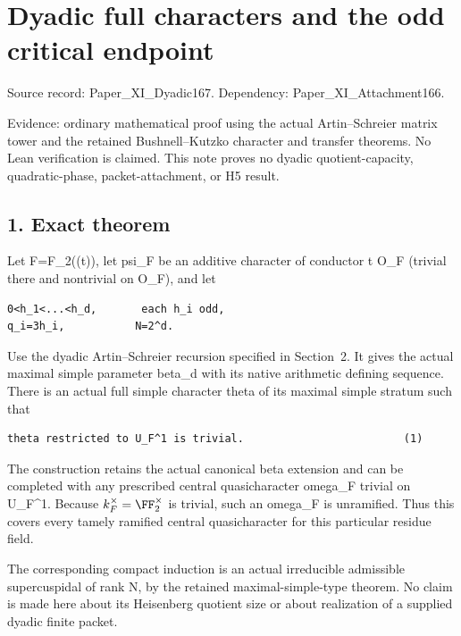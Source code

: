 \clearpage
\section{Dyadic full characters and the odd critical endpoint}\label{app:dyadic_character}

Source record: Paper\_XI\_Dyadic167. Dependency:
Paper\_XI\_Attachment166.

Evidence: ordinary mathematical proof using the actual Artin--Schreier
matrix tower and the retained Bushnell--Kutzko character and transfer
theorems. No Lean verification is claimed. This note proves no dyadic
quotient-capacity, quadratic-phase, packet-attachment, or H5 result.

\hypertarget{dyadic_character-exact-theorem}{%
\subsection{1. Exact theorem}\label{dyadic_character-exact-theorem}}

Let F=F\_2((t)), let psi\_F be an additive character of conductor t O\_F
(trivial there and nontrivial on O\_F), and let

\begin{Verbatim}[fontsize=\small,breaklines=true,breakanywhere=true]
0<h_1<...<h_d,       each h_i odd,
q_i=3h_i,           N=2^d.
\end{Verbatim}

Use the dyadic Artin--Schreier recursion specified in Section~2. It gives
the actual maximal simple parameter beta\_d with its native arithmetic
defining sequence. There is an actual full simple character theta of its
maximal simple stratum such that

\begin{Verbatim}[fontsize=\small,breaklines=true,breakanywhere=true]
theta restricted to U_F^1 is trivial.                         (1)
\end{Verbatim}

The construction retains the actual canonical beta extension and can be
completed with any prescribed central quasicharacter omega\_F trivial on
U\_F\^{}1. Because \(k_F^\times=\FF_2^\times\) is trivial,
such an omega\_F is unramified. Thus this covers every tamely ramified
central quasicharacter for this particular residue field.

The corresponding compact induction is an actual irreducible admissible
supercuspidal of rank N, by the retained maximal-simple-type theorem. No
claim is made here about its Heisenberg quotient size or about
realization of a supplied dyadic finite packet.

